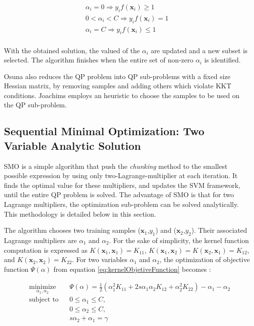 \documentclass{ipol}
\def\x{{\mathbf x}}
\begin{document}
\begin{equation} \label{eq:kktconditions}
\begin{aligned}
\alpha_i=0 \Rightarrow y_i f(\x_i) \geq 1 \\
0 < \alpha_i < C \Rightarrow y_i f(\x_i) = 1 \\
\alpha_i = C \Rightarrow y_i f(\x_i) \leq 1 \\
\end{aligned}
\end{equation}

With the obtained solution, the valued of the $\alpha_i$ are updated and a new subset is selected.
The algorithm finishes when the entire set of non-zero $\alpha_i$ is identified.

Osuna \cite{Osuna:1997} also reduces the QP problem into QP sub-problems with a fixed size Hessian matrix, by removing samples and adding others which violate KKT conditions.
Joachims \cite{Joachims:1998} employs an heuristic to choose the samples to be used on the QP sub-problem.


\subsection{Sequential Minimal Optimization: Two Variable Analytic Solution}\label{sec:twovars}

SMO is a simple algorithm that push the \textit{chunking} method to the smallest possible expression by using only two-Lagrange-multiplier at each iteration.
It finds the optimal value for these multipliers, and updates the SVM framework, until the entire QP problem is solved.
The advantage of SMO is that for two Lagrange multipliers, the optimization sub-problem can be solved analytically.
This methodology is detailed below in this section.

The algorithm chooses two training samples ($\x_1$,$y_1$) and ($\x_2$,$y_2$).
Their associated Lagrange multipliers are $\alpha_1$ and $\alpha_2$.
For the sake of simplicity, the kernel function computation is expressed as $K(\x_1,\x_1)=K_{11}$, $K(\x_1,\x_2)=K(\x_2,\x_1)=K_{12}$, and $K(\x_2,\x_2)=K_{22}$.
For two variables $\alpha_1$ and $\alpha_2$, the optimization of objective function $\Psi(\alpha)$ from equation \ref{eq:kernelObjetiveFunction} becomes \cite{Scholkopf:2002}:

\begin{equation}\label{eq:twoVarOptimization}
\begin{aligned}
& \underset{\alpha_1,\alpha_2}{\text{minimize}}
& & \Psi(\alpha) = \frac{1}{2} (\alpha_1^2 K_{11} + 2 s \alpha_1 \alpha_2 K_{12} + \alpha_2^2 K_{22}) - \alpha_1 - \alpha_2 \\
& \text{subject to}
& & 0 \leq \alpha_1 \leq C, \\
&&& 0 \leq \alpha_2 \leq C, \\
&&& s \alpha_2 + \alpha_1 = \gamma 
\end{aligned}
\end{equation}
\end{document}
